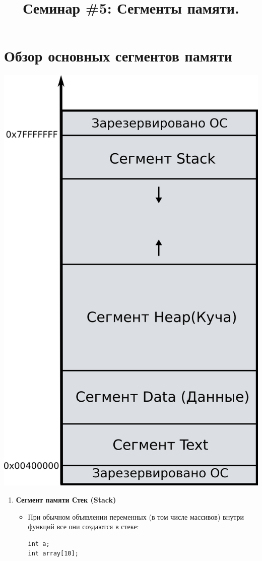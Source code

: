 \documentclass[10pt]{article}
\begin{document}
\title{Семинар \#5: Сегменты памяти.\vspace{-5ex}}\date{}\maketitle
\section*{Обзор основных сегментов памяти}
\begin{multicols}{2}
\begin{center}
\includegraphics[scale=1.1]{../images/memory_layout.png}
\end{center}
\columnbreak
\begin{enumerate}
\item \textbf{Сегмент памяти Стек (Stack)} \\
\begin{itemize}
\item При обычном объявлении переменных (в том числе массивов) внутри функций все они создаются в стеке: 
\begin{lstlisting}
int a; 
int array[10];
\end{lstlisting}



\end{itemize}
\end{enumerate}
\end{multicols}
\end{document}
